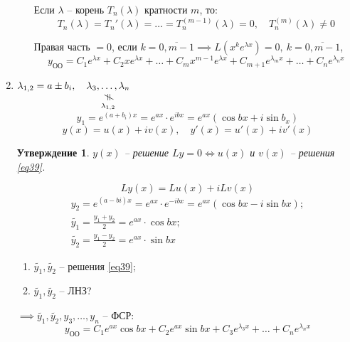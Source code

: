 \documentclass[11pt,a4paper,oneside]{report}
\newcommand{\vertneq}[0]{\rotatebox{90}{$\ne$}}
\newcommand{\nequalto}[2]{\underset{\scriptstyle\overset{\mkern4mu\vertneq}{#2}}{#1}}
\theoremstyle{definition}
\theoremstyle{plain}
\newtheorem{statement}{Утверждение}[section]
\theoremstyle{remark}
\begin{document}
\begin{enumerate}
\begin{enumerate}
                    Если $\lambda$ -- корень $T_n(\lambda)$ кратности $m$, то:
                    \begin{equation*}
                        T_n(\lambda) = T_n'(\lambda) = \ldots = T_n^{(m-1)}(\lambda) = 0, \quad T_n^{(m)}(\lambda) \ne 0
                    \end{equation*}

                    Правая часть $= 0$, если $k = \overline{0,m-1} \implies L(x^ke^{\lambda x}) = 0, \ k=\overline{0,m-1}$,
                    \begin{equation*}
                        y_{\text{ОО}} = C_1e^{\lambda x} + C_2 x e^{\lambda x} + \ldots + C_m x^{m-1} e^{\lambda x} + C_{m+1} e^{\lambda_m x} +\ldots + C_n e^{\lambda_n x}
                    \end{equation*}
          \end{enumerate}
    \item $\lambda_{1,2} = a\pm b_i, \quad \nequalto{\lambda_3,\ldots,\lambda_n}{\lambda_{1,2}}$
          \begin{equation*}
              y_1 = e^{(a + b_i)x} = e^{ax}\cdot e^{ibx} = e^{ax}(\cos bx + i \sin b_x)
          \end{equation*}
          \begin{equation*}
              y(x) = u(x) + i v(x), \quad y'(x) = u'(x) + iv'(x)
          \end{equation*}

          \begin{statement}
              $y(x)$ -- решение $Ly = 0 \iff u(x)$ и $v(x)$ -- решения \ref{eq39}.
          \end{statement}
          \begin{equation*}
              Ly(x) = Lu(x) + iLv(x)
          \end{equation*}
          \begin{align*}
              y_2 = e^{(a-bi)x} = e^{ax}\cdot e^{-ibx} = e^{ax}(\cos bx - i\sin bx); \\
              \widetilde{y_1} = \frac{y_1 + y_2}{2} = e^{ax} \cdot \cos bx;          \\
              \widetilde{y_2} = \frac{y_1 - y_2}{2} = e^{ax}\cdot \sin bx
          \end{align*}
          \begin{enumerate}
              \item $\widetilde{y_1},\widetilde{y_2}$ -- решения \ref{eq39};
              \item $\widetilde{y_1},\widetilde{y_2}$ -- ЛНЗ?
          \end{enumerate}
          $\implies \widetilde{y_1}, \widetilde{y_2}, y_3, \ldots, y_n$ -- ФСР:
          \begin{equation*}
              y_{\text{ОО}} = C_1e^{ax}\cos bx + C_2 e^{ax}\sin bx + C_3 e^{\lambda_3x} + \ldots + C_n e^{\lambda_n x}
          \end{equation*}


\end{enumerate}
\end{document}

